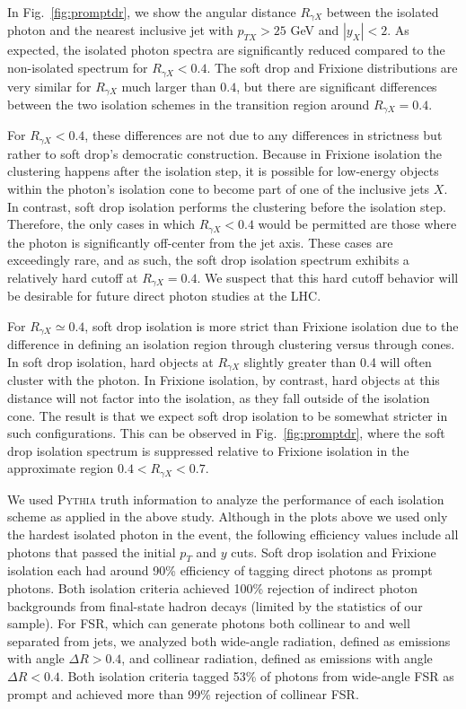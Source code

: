 \documentclass[a4paper,11pt]{article}
\DeclareRobustCommand{\Fig}[1]{Fig.~\ref{#1}}
\begin{document}
In \Fig{fig:promptdr}, we show the angular distance $R_{\gamma X}$ between the isolated photon and the nearest inclusive jet with $p_{T X} > 25$ GeV and $|y_X| < 2$.
%
As expected, the isolated photon spectra are significantly reduced compared to the non-isolated spectrum for $R_{\gamma X} < 0.4$.
%
The soft drop and Frixione distributions are very similar for $R_{\gamma X}$  much larger than $0.4$, but there are significant differences between the two isolation schemes in the transition region around $R_{\gamma X} = 0.4$.

For $R_{\gamma X} < 0.4$, these differences are not due to any differences in strictness but rather to soft drop's democratic construction.
%
Because in Frixione isolation the clustering happens after the isolation step, it is possible for low-energy objects within the photon's isolation cone to become part of one of the inclusive jets $X$.
%
In contrast, soft drop isolation performs the clustering before the isolation step.
%
Therefore, the only cases in which $R_{\gamma X} < 0.4$ would be permitted are those where the photon is significantly off-center from the jet axis.
%
These cases are exceedingly rare, and as such, the soft drop isolation spectrum exhibits a relatively hard cutoff at $R_{\gamma X} = 0.4$.
%
We suspect that this hard cutoff behavior will be desirable for future direct photon studies at the LHC.

For $R_{\gamma X} \simeq 0.4$, soft drop isolation is more strict than Frixione isolation due to the difference in defining an isolation region through clustering versus through cones.
%
In soft drop isolation, hard objects at $R_{\gamma X}$ slightly greater than 0.4 will often cluster with the photon.
%
In Frixione isolation, by contrast, hard objects at this distance will not factor into the isolation, as they fall outside of the isolation cone.
%
The result is that we expect soft drop isolation to be somewhat stricter in such configurations.
%
This can be observed in \Fig{fig:promptdr}, where the soft drop isolation spectrum is suppressed relative to Frixione isolation in the approximate region $0.4 < R_{\gamma X} < 0.7$.

We used \textsc{Pythia} truth information to analyze the performance of each isolation scheme as applied in the above study.
%
Although in the plots above we used only the hardest isolated photon in the event, the following efficiency values include all photons that passed the initial $p_T$ and $y$ cuts.
%
Soft drop isolation and Frixione isolation each had around 90\% efficiency of tagging direct photons as prompt photons.
%
Both isolation criteria achieved 100\% rejection of indirect photon backgrounds from final-state hadron decays (limited by the statistics of our sample).
%
For FSR, which can generate photons both collinear to and well separated from jets, we analyzed both wide-angle radiation, defined as emissions with angle $\Delta R > 0.4$, and collinear radiation, defined as emissions with angle $\Delta R < 0.4$.
%
Both isolation criteria tagged 53\% of photons from wide-angle FSR as prompt and achieved more than 99\% rejection of collinear FSR.
\end{document}
